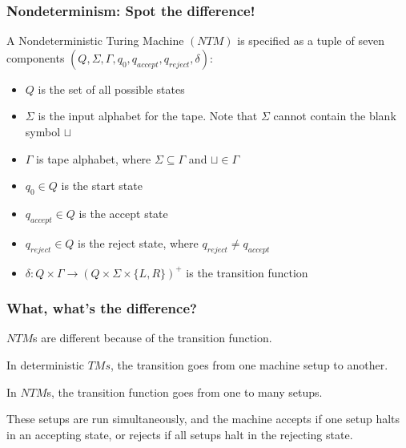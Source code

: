 \documentclass[aspectratio=169]{beamer}
\begin{document}
\begin{frame}
\frametitle{Nondeterminism: Spot the difference!}
A Nondeterministic Turing Machine $(NTM)$ is specified as a tuple of seven components $(Q, \Sigma, \Gamma, q_0, q_{accept}, q_{reject}, \delta)$:

\begin{itemize}
    \item<1-> $Q$ is the set of all possible states
    \item<2-> $\Sigma$ is the input alphabet for the tape. Note that $\Sigma$ cannot contain the blank symbol $\sqcup$
    \item<3-> $\Gamma$ is tape alphabet, where $\Sigma \subseteq \Gamma$ and $\sqcup \in \Gamma$
    \item<4-> $q_0 \in Q$ is the start state
    \item<5-> $q_{accept} \in Q$ is the accept state
    \item<6-> $q_{reject} \in Q$ is the reject state, where $q_{reject} \neq q_{accept}$
    \item<7-> $\delta: Q \times \Gamma \to (Q \times \Sigma \times \{L, R\})^+$ is the transition function
\end{itemize}
\end{frame}

\begin{frame}
\frametitle{What, what's the difference?}
$NTM$s are different because of the transition function.

In deterministic $TMs$, the transition goes from one machine setup to another.

In $NTM$s, the transition function goes from one to many setups.

These setups are run simultaneously, and the machine accepts if one setup halts in an accepting state, or rejects if all setups halt in the rejecting state.
\end{frame}
\end{document}
